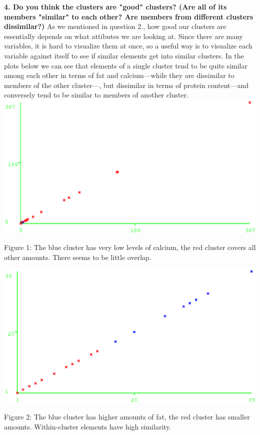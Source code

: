 \documentclass[]{article}
\begin{document}
\noindent\textbf{4. Do you think the clusters are "good" clusters? (Are all of its members "similar" to each other? Are members from different clusters dissimilar?)}
As we mentioned in question 2., how good our clusters are essentially depends on what attibutes we are looking at. Since there are many variables, it is hard to visualize them at once, so a useful way is to visualize each variable against itself to see if similar elements get into similar clusters. In the plots below we can see that elements of a single cluster tend to be quite similar among each other in terms of fat and calcium---while they are dissimilar to members of the other cluster---, but dissimilar in terms of protein content---and conversely tend to be similar to members of another cluster.\\

\includegraphics[scale=0.65]{figures/calcium_calcium.eps}

\noindent Figure 1: The blue cluster has very low levels of calcium, the red cluster covers all other amounts. There seems to be little overlap.


\includegraphics[scale=0.65]{figures/fat_fat.eps}

\noindent Figure 2: The blue cluster has higher amounts of fat, the red cluster has smaller amounts. Within-cluster elements have high similarity.
\end{document}
